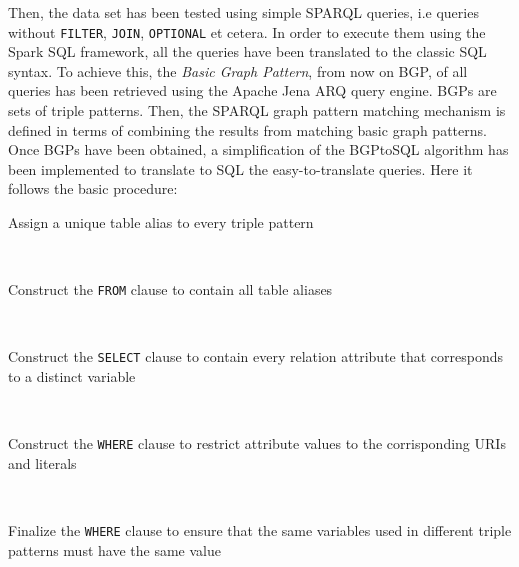 \documentclass[10pt, a4paper]{report}
\begin{document}
Then, the data set has been tested using simple SPARQL queries, i.e queries without \texttt{FILTER}, \texttt{JOIN}, \texttt{OPTIONAL} et cetera. In order to execute them using the Spark SQL framework, all the queries have been translated to the classic SQL syntax. To achieve this, the \textit{Basic Graph Pattern}, from now on BGP, of all queries has been retrieved using the Apache Jena ARQ query engine\cite{jena_arq}. BGPs are sets of triple patterns. Then, the SPARQL graph pattern matching mechanism is defined in terms of combining the results from matching basic graph patterns. Once BGPs have been obtained, a simplification of the BGPtoSQL algorithm has been implemented to translate to SQL the easy-to-translate queries. Here it follows the basic procedure: \\

\begin{enumerate}
	\begin{minipage}{0.92\textwidth}
		\item Assign a unique table alias to every triple pattern \\
	\end{minipage} \\
	\begin{minipage}{0.92\textwidth}
		\item Construct the \texttt{FROM} clause to contain all table aliases \\
	\end{minipage} \\
	\begin{minipage}{0.92\textwidth}
		\item Construct the \texttt{SELECT} clause to contain every relation attribute that corresponds to a distinct variable \\
	\end{minipage} \\
	\begin{minipage}{0.92\textwidth}
		\item Construct the \texttt{WHERE} clause to restrict attribute values to the corrisponding URIs and literals \\
	\end{minipage} \\
	\begin{minipage}{0.92\textwidth}
		\item Finalize the \texttt{WHERE} clause to ensure that the same variables used in different triple patterns must have the same value \\
	\end{minipage}
\end{enumerate}
\end{document}
